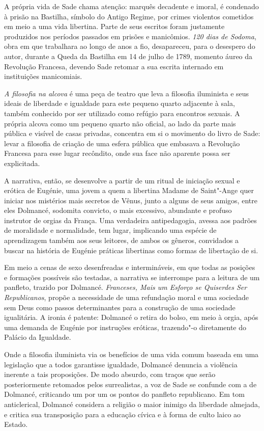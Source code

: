 A própria vida de Sade chama atenção: marquês decadente e imoral,
é condenado à prisão na Bastilha, símbolo do Antigo Regime, por crimes
violentos cometidos em meio a uma vida libertina. Parte de seus escritos
foram justamente produzidos nos períodos passados em prisões e
manicômios. \emph{120 dias de Sodoma}, obra em que trabalhara ao longo
de anos a fio, desapareceu, para o desespero do autor, durante a Queda
da Bastilha em 14 de julho de 1789, momento áureo da Revolução Francesa,
devendo Sade retomar a sua escrita internado em instituições
manicomiais.

\emph{A filosofia na alcova} é uma peça de teatro que leva a filosofia
iluminista e seus ideais de liberdade e igualdade para este
pequeno quarto adjacente à sala, também conhecido por ser utilizado como
refúgio para encontros sexuais. A própria alcova como um pequeno quarto
não oficial, ao lado da parte mais pública e visível de casas privadas,
concentra em si o movimento do livro de Sade: levar a filosofia de criação de
uma esfera pública que embasava a Revolução Francesa para esse lugar
recôndito, onde sua face não aparente possa ser explicitada.

A narrativa, então, se desenvolve a partir de um ritual de iniciação
sexual e erótica de Eugénie, uma jovem a quem a libertina Madame de
Saint"-Ange quer iniciar nos mistérios mais secretos de Vênus, junto a
alguns de seus amigos, entre eles Dolmancé, sodomita convicto, o mais
excessivo, abundante e profuso instrutor de orgias da França. Uma
verdadeira antipedagogia, avessa aos padrões de moralidade e
normalidade, tem lugar, implicando uma espécie de aprendizagem também aos
seus leitores, de ambos os gêneros, convidados a buscar na
história de Eugénie práticas libertinas como formas de libertação
de si.

Em meio a cenas de sexo desenfreadas e intermináveis, em que todas as
posições e formações possíveis são testadas, a narrativa se interrompe
para a leitura de um panfleto, trazido por Dolmancé. \emph{Franceses,
Mais um Esforço se Quiserdes Ser Republicanos}, propõe a
necessidade de uma refundação moral e uma sociedade sem Deus como passos
determinantes para a construção de uma sociedade igualitária. A ironia é
patente: Dolmancé o retira do bolso, em meio à orgia, após uma demanda
de Eugénie por instruções eróticas, trazendo"-o diretamente do Palácio da
Igualdade.

Onde a filosofia iluminista via os benefícios de uma vida comum baseada
em uma legislação que a todos garantisse igualdade, Dolmancé denuncia a
violência inerente a tais proposições. De modo absurdo, com traços que
serão posteriormente retomados pelos surrealistas, a voz de Sade se confunde
com a de Dolmancé, criticando um por um os
pontos do panfleto republicano. Em tom anticlerical, Dolmancé considera a
religião o maior inimigo da liberdade almejada, e critica sua transposição
para a educação cívica e à forma de culto laico ao Estado.

